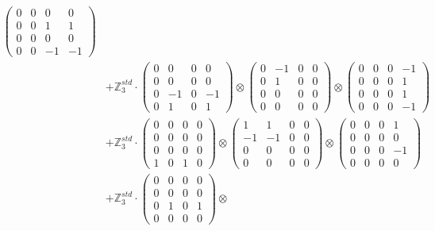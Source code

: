 \documentclass{article}
\begin{document}
{\begin{align}
            \begin{pmatrix} 0 & 0 & 0 & 0 \\ 0 & 0 & 1 & 1 \\ 0 & 0 & 0 & 0 \\ 0 & 0 & -1 & -1 \end{pmatrix} \\ 
        &+ \label{Rs4-Rc15-Solution-1-c9} \mathbb{Z}_3^{std} \cdot 
            \begin{pmatrix} 0 & 0 & 0 & 0 \\ 0 & 0 & 0 & 0 \\ 0 & -1 & 0 & -1 \\ 0 & 1 & 0 & 1 \end{pmatrix} \otimes 
            \begin{pmatrix} 0 & -1 & 0 & 0 \\ 0 & 1 & 0 & 0 \\ 0 & 0 & 0 & 0 \\ 0 & 0 & 0 & 0 \end{pmatrix} \otimes 
            \begin{pmatrix} 0 & 0 & 0 & -1 \\ 0 & 0 & 0 & 1 \\ 0 & 0 & 0 & 1 \\ 0 & 0 & 0 & -1 \end{pmatrix} \\ 
        &+ \label{Rs4-Rc15-Solution-1-c10} \mathbb{Z}_3^{std} \cdot 
            \begin{pmatrix} 0 & 0 & 0 & 0 \\ 0 & 0 & 0 & 0 \\ 0 & 0 & 0 & 0 \\ 1 & 0 & 1 & 0 \end{pmatrix} \otimes 
            \begin{pmatrix} 1 & 1 & 0 & 0 \\ -1 & -1 & 0 & 0 \\ 0 & 0 & 0 & 0 \\ 0 & 0 & 0 & 0 \end{pmatrix} \otimes 
            \begin{pmatrix} 0 & 0 & 0 & 1 \\ 0 & 0 & 0 & 0 \\ 0 & 0 & 0 & -1 \\ 0 & 0 & 0 & 0 \end{pmatrix} \\ 
        &+ \label{Rs4-Rc15-Solution-1-c11} \mathbb{Z}_3^{std} \cdot 
            \begin{pmatrix} 0 & 0 & 0 & 0 \\ 0 & 0 & 0 & 0 \\ 0 & 1 & 0 & 1 \\ 0 & 0 & 0 & 0 \end{pmatrix} \otimes 

\end{align}}
\end{document}
